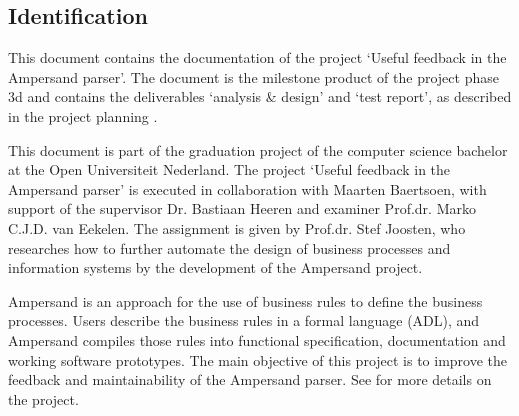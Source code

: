 
\subsection{Identification}
This document contains the documentation of the project `Useful feedback in the Ampersand parser'.
The document is the milestone product of the project phase 3d and contains the deliverables `analysis \& design' and `test report', as described in the project planning .

This document is part of the graduation project of the computer science bachelor at the Open Universiteit Nederland.
The project `Useful feedback in the Ampersand parser' is executed in collaboration with Maarten Baertsoen, with support of the supervisor Dr. Bastiaan Heeren and examiner Prof.dr. Marko C.J.D. van Eekelen.
The assignment is given by Prof.dr. Stef Joosten, who researches how to further automate the design of business processes and information systems by the development of the Ampersand project.

Ampersand is an approach for the use of business rules to define the business processes.
Users describe the business rules in a formal language (ADL), and Ampersand compiles those rules into functional specification, documentation and working software prototypes.
The main objective of this project is to improve the feedback and maintainability of the Ampersand parser.
See  for more details on the project.
